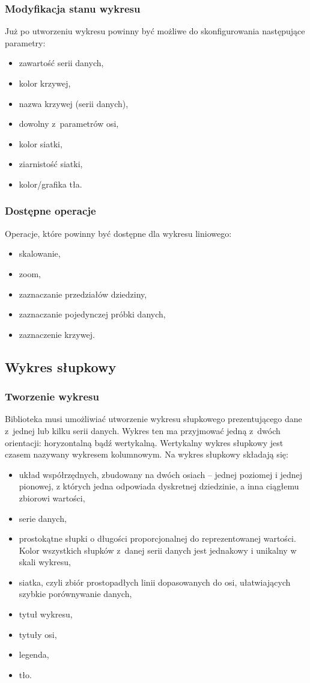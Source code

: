 \documentclass[11pt,twoside,a4paper,final]{article}
\begin{document}
\subsubsection{Modyfikacja stanu wykresu}
Już po utworzeniu wykresu powinny być możliwe do skonfigurowania następujące parametry:
\begin{itemize}
\item{zawartość serii danych,}
\item{kolor krzywej,}
\item{nazwa krzywej (serii danych),}
\item{dowolny z~parametrów osi,}
\item{kolor siatki,}
\item{ziarnistość siatki,}
\item{kolor/grafika tła.}
\end{itemize}

\subsubsection{Dostępne operacje}
Operacje, które powinny być dostępne dla wykresu liniowego:
\begin{itemize}
\item{skalowanie,}
\item{zoom,}
\item{zaznaczanie przedziałów dziedziny,}
\item{zaznaczanie pojedynczej próbki danych,}
\item{zaznaczenie krzywej.}
\end{itemize}

\subsection{Wykres słupkowy}
\subsubsection{Tworzenie wykresu}
Biblioteka musi umożliwiać utworzenie wykresu słupkowego prezentującego dane z~jednej lub kilku serii danych. Wykres ten ma przyjmować jedną z~dwóch orientacji: horyzontalną bądź wertykalną. Wertykalny wykres słupkowy jest czasem nazywany wykresem kolumnowym. Na wykres słupkowy składają się:
\begin{itemize}
\item{układ współrzędnych, zbudowany na dwóch osiach -- jednej poziomej i jednej pionowej, z których jedna odpowiada dyskretnej dziedzinie, a inna ciągłemu zbiorowi wartości,}
\item{serie danych,}
\item{prostokątne słupki o długości proporcjonalnej do reprezentowanej wartości. Kolor wszystkich słupków z~danej serii danych jest jednakowy i unikalny w skali wykresu,}
\item{siatka, czyli zbiór prostopadłych linii dopasowanych do osi, ułatwiających szybkie porównywanie danych,}
\item{tytuł wykresu,}
\item{tytuły osi,}
\item{legenda,}
\item{tło.}
\end{itemize}
\end{document}
